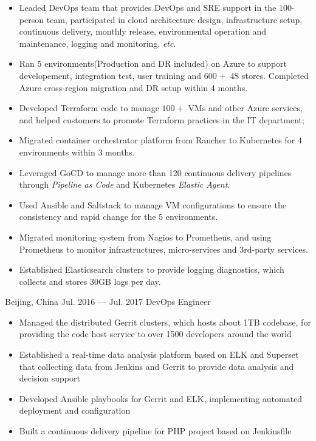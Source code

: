 \documentclass{resume}
\begin{document}
\begin{body}
\begin{itemize}[noitemsep,topsep=0pt]
\begin{itemize}[noitemsep,topsep=0pt]
			\item Leaded DevOps team that provides DevOps and SRE support in the $100$-person team, participated in cloud architecture design, infrastructure setup, continuous delivery, monthly release, environmental operation and maintenance, logging and monitoring, \textit{etc}.
			\item Ran 5 environments(Production and DR included) on Azure to support developement, integration test, user training and $600+$ 4S stores. Completed Azure cross-region migration and DR setup within 4 months.
			\item Developed Terraform code to manage $100+$ VMs and other Azure services, and helped customers to promote Terraform practices in the IT department;
			\item Migrated container orchestrator platform from Rancher to Kubernetes for 4 environments within 3 months.
			\item Leveraged GoCD to manage more than 120 continuous delivery pipelines through \textit{Pipeline as Code} and Kubernetes \textit{Elastic Agent}.
			\item Used Ansible and Saltstack to manage VM configurations to ensure the consistency and rapid change for the 5 environments.
			\item Migrated monitoring system from Nagios to Prometheus, and using Prometheus to monitor infrastructures, micro-services and 3rd-party services.
			\item Established Elasticsearch clusters to provide logging diagnostics, which collects and stores 30GB logs per day.
		\end{itemize}
	\end{itemize}
\end{body}

\smallskip
\begin{body}
	{Beijing, China}
	{Jul. 2016 --- Jul. 2017}
	{DevOps Engineer}
	\begin{itemize}[noitemsep,topsep=0pt]
		\item Managed the distributed Gerrit clusters, which hosts about 1TB codebase, for providing the code host service to over 1500 developers around the world
		\item Established a real-time data analysis platform based on ELK and Superset that collecting data from Jenkins and Gerrit to provide data analysis and decision support
		\item Developed Ansible playbooks for Gerrit and ELK, implementing automated deployment and configuration
		\item Built a continuous delivery pipeline for PHP project based on Jenkinsfile
	\end{itemize}
\end{body}
\end{document}

